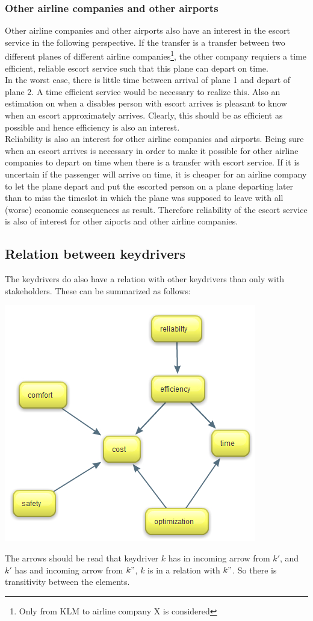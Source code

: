 \documentclass[a4paper, 12pt, notitlepage]{report}
\begin{document}
\subsubsection{Other airline companies and other airports}
Other airline companies and other airports also have an interest in the escort service in the following perspective. If the transfer is a transfer between two different planes of different airline companies\footnote{Only from KLM to airline company X is considered}, the other company requiers a time efficient, reliable escort service such that this plane can depart on time.\\
In the worst case, there is little time between arrival of plane 1 and depart of plane 2. A time efficient service would be necessary to realize this. Also an estimation on when a disables person with escort arrives is pleasant to know when an escort approximately arrives. Clearly, this should be as efficient as possible and hence efficiency is also an interest.\\
Reliability is also an interest for other airline companies and airports. Being sure when an escort arrives is necessary in order to make it possible for other airline companies to depart on time when there is a transfer with escort service. If it is uncertain if the passenger will arrive on time, it is cheaper for an airline company to let the plane depart and put the escorted person on a plane departing later than to miss the timeslot in which the plane was supposed to leave with all (worse) economic consequences as result. Therefore reliability of the escort service is also of interest for other aiports and other airline companies.
\newpage
\subsection{Relation between keydrivers}
The keydrivers do also have a relation with other keydrivers than only with stakeholders. These can be summarized as follows:
\begin{center}
	\includegraphics[scale=0.45]{figures/relationkeydrivers.jpg}
\end{center}
The arrows should be read that keydriver $k$ has in incoming arrow from $k'$, and $k'$ has and incoming arrow from $k"$, $k$ is in a relation with $k"$. So there is transitivity between the elements.
\end{document}
